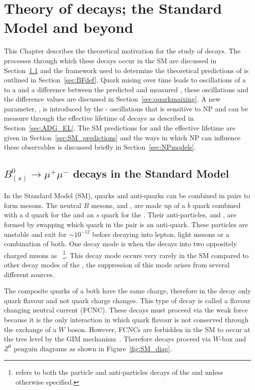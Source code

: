 \chapter{Theory of  decays; the Standard Model and beyond}
\label{sec:theory_chptr}
This Chapter describes the theoretical motivation for the study of \bmumu decays. 
The processes through which these decays occur in the SM are discussed in Section~\ref{sec:bsmumu_in_SM} and the framework used to determine the theoretical predictions of \BFs is outlined in Section~\ref{sec:BFdef}. 
Quark mising over time leads to oscillations of a \bs to a \barbs and a difference between the predicted and measured \bsmumu \BF, these oscillations and the difference \BFs values are discussed in Section~\ref{sec:quarkmaixing}. 
A new parameter, \ADG, is introduced by the \bs - \barbs oscillations that is sensitive to NP and can be measure through the effective lifetime of \bsmumu decays as described in Section~\ref{sec:ADG_EL}. The SM predictions for \BFs and the effective lifetime are given in Section~\ref{sec:SM_predictions} and the ways in which NP can influence these observables is discussed briefly in Section~\ref{sec:NPmodels}.



\section{$B^0_{(s)}\to \mu^+ \mu^-$ decays in the Standard Model}
\label{sec:bsmumu_in_SM}
In the Standard Model (SM), quarks and anti-quarks can be combined in pairs to form mesons. The neutral $B$ mesons, \bd and \bs, are made up of a $\bar{b}$ quark combined with a d quark for the \bd and an $s$ quark for the \bs. Their anti-particles, \barbd and \barbs, are formed by swapping which quark in the pair is an anti-quark. These particles are unstable and exit for $\sim 10^{-12}$ before decaying into lepton, light mesons or a combination of both. One decay mode is when the \bsd decays into two oppositely charged muons as \bmumu~\footnote{\bmumu refers to both the particle and anti-particles decays of the \bd and \bs unless otherwise specified.}. This decay mode occurs very rarely in the SM compared to other decay modes of the \bsd, the suppression of this mode arises from several different sources.

The composite quarks of a \bsd both have the same charge, therefore in the decay \bmumu only quark flavour and not quark charge changes. This type of decay is called a flavour changing neutral current (FCNC). These decays must proceed via the weak force because it is the only interaction in which quark flavour is not conserved through the exchange of a $W$ boson. However, FCNCs are forbidden in the SM to occur at the tree level by the GIM mechanism~\cite{}. Therefore \bmumu decays proceed via $W$-box and $Z^0$ penguin diagrams as shown in Figure~\ref{fig:SM_diag}.

